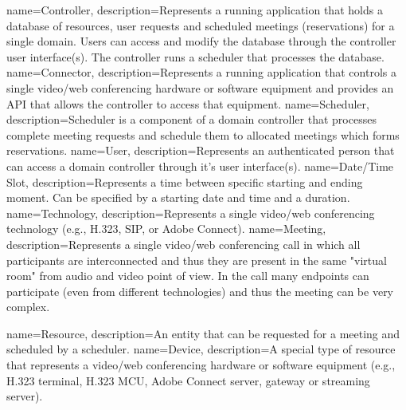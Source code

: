 %
%
{
  name=Controller,
  description={Represents a running application that holds a database of 
    resources, user requests and scheduled meetings (reservations) for a single 
    domain. Users can access and modify the database through the controller 
    user interface(s). The controller runs a scheduler that processes the 
    database.}
}
{
  name=Connector,
  description={Represents a running application that controls a single 
    video/web conferencing hardware or software equipment and provides an API 
    that allows the controller to access that equipment.}
}
{
  name=Scheduler,
  description={Scheduler is a component of a domain controller that processes 
    complete meeting requests and schedule them to allocated meetings which 
    forms reservations.}
}
{
  name=User,
  description={Represents an authenticated person that can access a domain 
    controller through it's user interface(s).}
}
{
  name=Date/Time Slot,
  description={Represents a time between specific starting and ending moment. 
    Can be specified by a starting date and time and a duration.}
}
{
  name=Technology,
  description={Represents a single video/web conferencing technology (e.g., 
    H.323, SIP, or Adobe Connect).}
}
{
  name=Meeting,
  description={Represents a single video/web conferencing call in which all 
    participants  are interconnected and thus they are present in the same 
    "virtual room" from audio and video point of view. In the call many 
    endpoints can participate (even from different technologies) and thus the 
    meeting can be very complex.}
}

%
%
{
  name=Resource,
  description={An entity that can be requested for a meeting and scheduled by a 
    scheduler.}
}
{
  name=Device,
  description={A special type of resource that represents a video/web 
    conferencing hardware or software equipment (e.g., H.323 terminal, H.323 
    MCU, Adobe Connect server, gateway or streaming server).}
}

